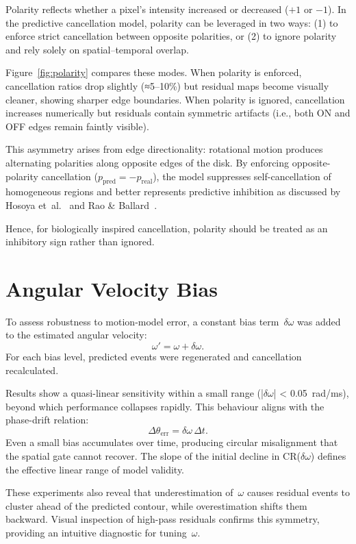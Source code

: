 Polarity reflects whether a pixel’s intensity increased or decreased (\(+1\) or \(-1\)).
In the predictive cancellation model, polarity can be leveraged in two ways:
(1) to enforce strict cancellation between opposite polarities, or 
(2) to ignore polarity and rely solely on spatial–temporal overlap.

Figure~\ref{fig:polarity} compares these modes.
When polarity is enforced, cancellation ratios drop slightly (≈5–10\%) but residual maps become visually cleaner, showing sharper edge boundaries.
When polarity is ignored, cancellation increases numerically but residuals contain symmetric artifacts (i.e., both ON and OFF edges remain faintly visible).

This asymmetry arises from edge directionality:
rotational motion produces alternating polarities along opposite edges of the disk.
By enforcing opposite-polarity cancellation (\(p_{\text{pred}} = -p_{\text{real}}\)), the model suppresses self-cancellation of homogeneous regions and better represents predictive inhibition as discussed by Hosoya et~al.~\cite{Hosoya2005Dynamic} and Rao \& Ballard~\cite{Rao1999Predictive}.

Hence, for biologically inspired cancellation, polarity should be treated as an inhibitory sign rather than ignored.

\section{Angular Velocity Bias}
\label{sec:omega_bias}

To assess robustness to motion-model error, a constant bias term~\(\delta\omega\) was added to the estimated angular velocity:
\[
\omega' = \omega + \delta\omega.
\]
For each bias level, predicted events were regenerated and cancellation recalculated.

Results show a quasi-linear sensitivity within a small range (|\(\delta\omega\)| < 0.05~rad/ms), beyond which performance collapses rapidly.
This behaviour aligns with the phase-drift relation:
\[
\Delta\theta_{\text{err}} = \delta\omega\,\Delta t.
\]
Even a small bias accumulates over time, producing circular misalignment that the spatial gate cannot recover.
The slope of the initial decline in CR(\(\delta\omega\)) defines the effective linear range of model validity.

These experiments also reveal that underestimation of~\(\omega\) causes residual events to cluster ahead of the predicted contour, while overestimation shifts them backward.
Visual inspection of high-pass residuals confirms this symmetry, providing an intuitive diagnostic for tuning~\(\omega\).

